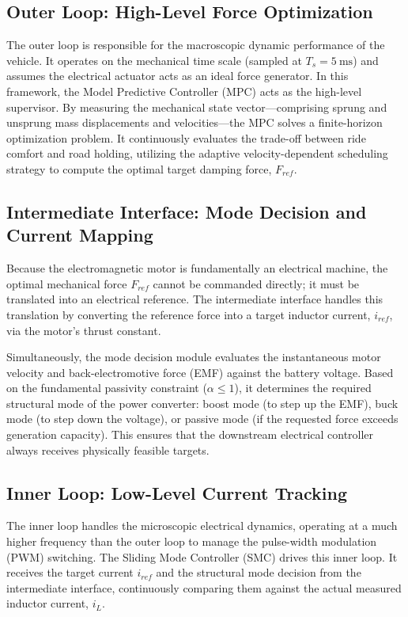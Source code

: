 \subsection{Outer Loop: High-Level Force Optimization}
The outer loop is responsible for the macroscopic dynamic performance of the vehicle. It operates on the mechanical time scale (sampled at $T_s = \SI{5}{\milli\second}$) and assumes the electrical actuator acts as an ideal force generator. In this framework, the Model Predictive Controller (MPC) acts as the high-level supervisor. By measuring the mechanical state vector—comprising sprung and unsprung mass displacements and velocities—the MPC solves a finite-horizon optimization problem. It continuously evaluates the trade-off between ride comfort and road holding, utilizing the adaptive velocity-dependent scheduling strategy to compute the optimal target damping force, $F_{ref}$.

\subsection{Intermediate Interface: Mode Decision and Current Mapping}
Because the electromagnetic motor is fundamentally an electrical machine, the optimal mechanical force $F_{ref}$ cannot be commanded directly; it must be translated into an electrical reference. The intermediate interface handles this translation by converting the reference force into a target inductor current, $i_{ref}$, via the motor's thrust constant. 

Simultaneously, the mode decision module evaluates the instantaneous motor velocity and back-electromotive force (EMF) against the battery voltage. Based on the fundamental passivity constraint ($\alpha \le 1$), it determines the required structural mode of the power converter: boost mode (to step up the EMF), buck mode (to step down the voltage), or passive mode (if the requested force exceeds generation capacity). This ensures that the downstream electrical controller always receives physically feasible targets.

\subsection{Inner Loop: Low-Level Current Tracking}
The inner loop handles the microscopic electrical dynamics, operating at a much higher frequency than the outer loop to manage the pulse-width modulation (PWM) switching. The Sliding Mode Controller (SMC) drives this inner loop. It receives the target current $i_{ref}$ and the structural mode decision from the intermediate interface, continuously comparing them against the actual measured inductor current, $i_L$. 

